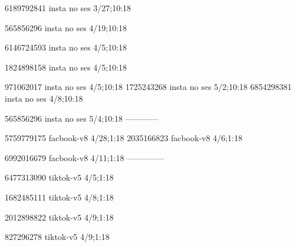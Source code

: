 
6189792841 insta no ses
3/27;10:18

565856296 insta no ses
4/19;10:18

6146724593 insta no ses
4/5;10:18

1824898158 insta no ses
4/5;10:18

971062017 insta no ses
4/5;10:18
1725243268 insta no ses
5/2;10:18
6854298381 insta no ses
4/8;10:18

565856296 insta no ses
5/4;10:18
------------


5759779175 facbook-v8
4/28;1:18
2035166823 facbook-v8
4/6;1:18

6992016679 facbook-v8
4/11;1:18
--------------



6477313090 tiktok-v5
4/5;1:18

1682485111 tiktok-v5
4/8;1:18

2012898822 tiktok-v5
4/9;1:18

827296278 tiktok-v5
4/9;1:18
